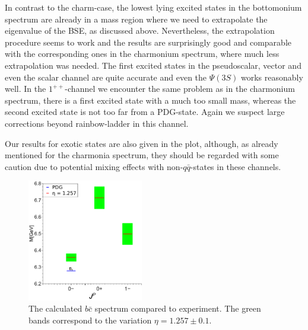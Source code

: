 %
In contrast to the charm-case, the lowest lying excited states in the bottomonium spectrum are
already in a mass region where we need to extrapolate the eigenvalue of the BSE, as discussed
above. Nevertheless, the extrapolation procedure seems to work and the results are surprisingly
good and comparable with the corresponding ones in the charmonium spectrum, where much less
extrapolation was needed. The first excited states in the pseudoscalar, vector and even the
scalar channel are quite accurate and even the $\Psi(3S)$ works reasonably well. In the $1^{++}$-channel
we encounter the same problem as in the charmonium spectrum, there is a first excited state 
with a much too small mass, whereas the second excited state is not too far from a PDG-state.
Again we suspect large corrections beyond rainbow-ladder in this channel.

Our results for exotic states are also given in the plot, although, as already mentioned 
for the charmonia spectrum, they should be regarded with some caution due to potential
mixing effects with non-$q\bar{q}$-states in these channels.

%
%
%
%
%

%
\begin{figure}[!thp]
  \begin{center}
    \includegraphics[width=0.45\textwidth]{figures/spectrum_bc}
    \caption{The calculated $b\bar{c}$ spectrum compared to experiment. The green bands correspond 
             to the variation $\eta=1.257\pm0.1$.}\label{fig:spectrumbc}
  \end{center}
\end{figure}

